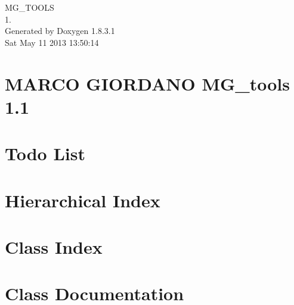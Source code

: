 \documentclass{book}
\begin{document}
\hypersetup{pageanchor=false,citecolor=blue}
\begin{titlepage}
\vspace*{7cm}
\begin{center}
{\Large M\-G\-\_\-\-T\-O\-O\-L\-S \\[1ex]\large 1. }\\
\vspace*{1cm}
{\large Generated by Doxygen 1.8.3.1}\\
\vspace*{0.5cm}
{\small Sat May 11 2013 13:50:14}\\
\end{center}
\end{titlepage}
\clearemptydoublepage
{}
\tableofcontents
\clearemptydoublepage
{}
\hypersetup{pageanchor=true,citecolor=blue}
\chapter{M\-A\-R\-C\-O G\-I\-O\-R\-D\-A\-N\-O M\-G\-\_\-tools 1.1}
\label{index}\hypertarget{index}{}
\chapter{Todo List}
\label{todo}
\hypertarget{todo}{}

\chapter{Hierarchical Index}

\chapter{Class Index}

\chapter{Class Documentation}



















\printindex
\end{document}
